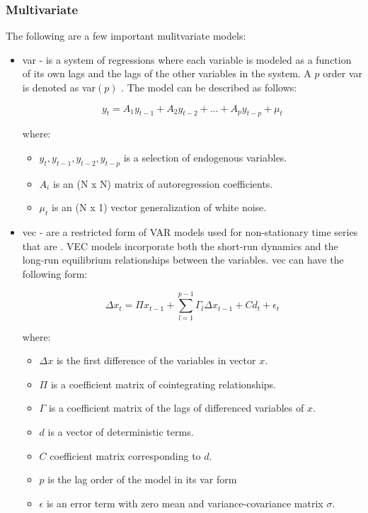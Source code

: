 \subsubsection{Multivariate}\label{Multivariate}

The following are a few important mulitvariate models:

\begin{itemize}
    \item \Gls{var} \cite{sims} - is a system of regressions where each variable is modeled as a function of its own lags and the lags of the other variables in the system. A $p$ order \gls{var} is denoted as \gls{var}$(p)$ \cite{deep-learning}. The model can be described as follows:

    $$y_{t} = A_{1}y_{t-1} + A_{2}y_{t-2} + ... + A_{p}y_{t-p} + \mu_{t}$$

    where:
        \begin{itemize}
            \item $y_{t}, y_{t-1}, y_{t-2}, y_{t-p}$ is a selection of endogenous variables.
            \item $A_{i}$ is an (N x N) matrix of autoregression coefficients.
            \item $\mu_{t}$ is an (N x 1) vector generalization of white noise.
        \end{itemize}

    \item \Gls{vec} \cite{johansen} - are a restricted form of VAR models used for non-stationary time series that are \cointegrated. VEC models incorporate both the short-run dynamics and the long-run equilibrium relationships between the variables. \gls{vec} can have the following form:

        $$\Delta x_{t} =\Pi x_{t-1} + \sum_{l=1}^{p-1}\Gamma_l\Delta x_{t-1} + Cd_{t} + \epsilon_{t}$$

        where:
        \begin{itemize}
            \item $\Delta x$ is the first difference of the variables in vector $x$.
            \item $\Pi$ is a coefficient matrix of cointegrating relationships.
            \item $\Gamma$ is a coefficient matrix of the lags of differenced variables of $x$.
            \item $d$ is a vector of deterministic terms.
            \item $C$ coefficient matrix corresponding to $d$.
            \item $p$ is the lag order of the model in its \gls{var} form
            \item $\epsilon$ is an error term with zero mean and variance-covariance matrix $\sigma$.
        \end{itemize}
\end{itemize}

